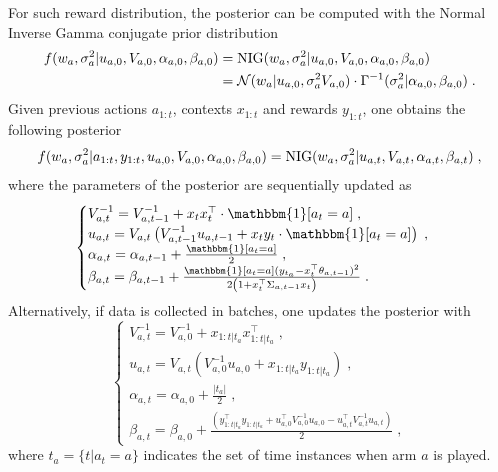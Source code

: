 \documentclass[10pt]{article}
\newcommand{\N}{\mathcal{N}}
\newcommand{\NIG}{{\rm NIG}}
\begin{document}
For such reward distribution, the posterior can be computed with the Normal Inverse Gamma conjugate prior distribution
\begin{equation}
\begin{split}
f(w_a, \sigma_a^2|u_{a,0}, V_{a,0},\alpha_{a,0}, \beta_{a,0}) &=\NIG(w_a, \sigma_a^2|u_{a,0}, V_{a,0},\alpha_{a,0}, \beta_{a,0}) \\
&= \N(w_a|u_{a,0}, \sigma_a^2 V_{a,0}) \cdot \Gamma^{-1}(\sigma_a^2|\alpha_{a,0}, \beta_{a,0}) \;. \\
\end{split}
\end{equation}
Given previous actions $a_{1:t}$, contexts $x_{1:t}$ and rewards $y_{1:t}$, one obtains the following posterior 
\begin{equation}
f(w_a, \sigma_a^2|a_{1:t},y_{1:t},u_{a,0}, V_{a,0},\alpha_{a,0}, \beta_{a,0}) =\NIG(w_a, \sigma_a^2|u_{a,t}, V_{a,t},\alpha_{a,t}, \beta_{a,t}) \; ,
\end{equation}
where the parameters of the posterior are sequentially updated as
\begin{equation}
\begin{cases}
V_{a,t}^{-1} = V_{a,t-1}^{-1} + x_t x_t^\top \cdot \mathbbm{1}[a_t=a] \; ,\\
u_{a,t}= V_{a,t} \left( V_{a,t-1}^{-1} u_{a,t-1} + x_t y_{t}\cdot \mathbbm{1}[a_t=a]\right) \; ,\\
\alpha_{a,t}=\alpha_{a,t-1} + \frac{\mathbbm{1}[a_t=a]}{2} \; ,\\
\beta_{a,t}=\beta_{a,t-1} + \frac{\mathbbm{1}[a_t=a](y_{t_a}-x_t^\top\theta_{a,t-1})^2}{2\left(1+x_t^\top \Sigma_{a,t-1} x_t\right)} \; .
\end{cases}
\end{equation}
Alternatively, if data is collected in batches, one updates the posterior with
\begin{equation}
\begin{cases}
V_{a,t}^{-1}= V_{a,0}^{-1}+x_{{1:t}|t_a} x_{{1:t}|t_a}^\top \; ,\\
u_{a,t}=V_{a,t}\left(V_{a,0}^{-1}u_{a,0}+x_{{1:t}|t_a} y_{{1:t}|t_a}\right) \; ,\\
\alpha_{a,t}=\alpha_{a,0} + \frac{|t_a|}{2} \; ,\\
\beta_{a,t}=\beta_{a,0} + \frac{\left(y_{{1:t}|t_a}^\top y_{{1:t}|t_a} + u_{a,0}^\top V_{a,0}^{-1}u_{a,0} - u_{a,t}^\top V_{a,t}^{-1}u_{a,t} \right)}{2} \; ,
\end{cases}
\end{equation}
where $t_a=\{t|a_t=a\}$ indicates the set of time instances when arm $a$ is played.
\end{document}
